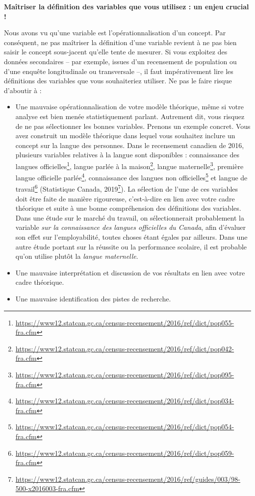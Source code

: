 \documentclass[
  11pt,
  french,
]{book}
\makeatletter
\renewcommand{\href}[2]{#2\footnote{\url{#1}}}
\newenvironment{kframev}{%
\medskip{}
\setlength{\fboxsep}{.8em}
 \def\at@end@of@kframev{}%
 \ifinner\ifhmode%
  \def\at@end@of@kframev{\end{minipage}}%
  \begin{minipage}{\columnwidth}%
 \fi\fi%
 \def\FrameCommand##1{\hskip\@totalleftmargin \hskip-\fboxsep
 \colorbox{shadebluecolor}{##1}\hskip-\fboxsep
     \hskip-\linewidth \hskip-\@totalleftmargin \hskip\columnwidth}%
 \MakeFramed {\advance\hsize-\width
   \@totalleftmargin\z@ \linewidth\hsize
   \@setminipage}}%
 {\par\unskip\endMakeFramed%
 \at@end@of@kframev}
\newenvironment{rmdblock}[1]
  {
  \begin{itemize}
  \renewcommand{\labelitemi}{
    \raisebox{-.7\height}[0pt][0pt]{
      {\setkeys{Gin}{width=3em,keepaspectratio}\texttt{[image: images/\#1]}}
    }
  }
  \setlength{\fboxsep}{1em}
  \begin{kframev}
  \small
  \item
  }
  {
  \end{kframev}
  \end{itemize}
  }
\newenvironment{bloc_attention}
  {\begin{rmdblock}{attention}}
  {\end{rmdblock}}
\makeatother
\begin{document}
\begin{bloc_attention}

\textbf{Maîtriser la définition des variables que vous utilisez : un enjeu crucial ! }

Nous avons vu qu'une variable est l'opérationnalisation d'un concept. Par conséquent, ne pas maîtriser la définition d'une variable revient à ne pas bien saisir le concept sous-jacent qu'elle tente de mesurer. Si vous exploitez des données secondaires -- par exemple, issues d'un recensement de population ou d'une enquête longitudinale ou transversale --, il faut impérativement lire les définitions des variables que vous souhaiteriez utiliser. Ne pas le faire risque d'aboutir à :

\begin{itemize}
\item
  Une mauvaise opérationnalisation de votre modèle théorique, même si votre analyse est bien menée statistiquement parlant. Autrement dit, vous risquez de ne pas sélectionner les bonnes variables. Prenons un exemple concret. Vous avez construit un modèle théorique dans lequel vous souhaitez inclure un concept sur la langue des personnes. Dans le recensement canadien de 2016, plusieurs variables relatives à la langue sont disponibles : \href{https://www12.statcan.gc.ca/census-recensement/2016/ref/dict/pop055-fra.cfm}{connaissance des langues officielles},
  \href{https://www12.statcan.gc.ca/census-recensement/2016/ref/dict/pop042-fra.cfm}{langue parlée à la maison}, \href{https://www12.statcan.gc.ca/census-recensement/2016/ref/dict/pop095-fra.cfm}{langue maternelle}, \href{https://www12.statcan.gc.ca/census-recensement/2016/ref/dict/pop034-fra.cfm}{première langue officielle parlée}, \href{https://www12.statcan.gc.ca/census-recensement/2016/ref/dict/pop054-fra.cfm}{connaissance des langues non officielles} et \href{https://www12.statcan.gc.ca/census-recensement/2016/ref/dict/pop059-fra.cfm}{langue de travail} (\href{https://www12.statcan.gc.ca/census-recensement/2016/ref/guides/003/98-500-x2016003-fra.cfm}{Statistique Canada, 2019}). La sélection de l'une de ces variables doit être faite de manière rigoureuse, c'est-à-dire en lien avec votre cadre théorique et suite à une bonne compréhension des définitions des variables. Dans une étude sur le marché du travail, on sélectionnerait probablement la variable \emph{sur la connaissance des langues officielles du Canada}, afin d'évaluer son effet sur l'employabilité, toutes choses étant égales par ailleurs. Dans une autre étude portant sur la réussite ou la performance scolaire, il est probable qu'on utilise plutôt la \emph{langue maternelle}.
\item
  Une mauvaise interprétation et discussion de vos résultats en lien avec votre cadre théorique.
\item
  Une mauvaise identification des pistes de recherche.
\end{itemize}


\end{bloc_attention}
\end{document}
